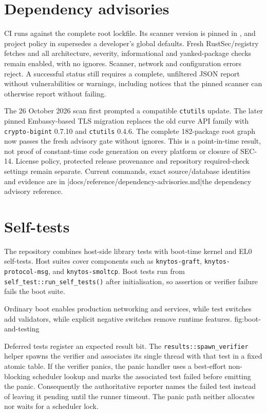 \section{Dependency advisories}

CI runs  against the complete root
lockfile. Its scanner version is pinned in , and project
policy in  supersedes a developer's global defaults.
Fresh RustSec/registry fetches and all architecture, severity, informational and
yanked-package checks remain enabled, with no ignores. Scanner, network and
configuration errors reject. A successful status still requires a complete,
unfiltered JSON report without vulnerabilities or warnings, including notices
that the pinned scanner can otherwise report without failing.

The 26 October 2026 scan first prompted a compatible \texttt{ctutils} update.
The later pinned Embassy-based TLS migration replaces the old curve API
family with \texttt{crypto-bigint} 0.7.10 and \texttt{ctutils} 0.4.6. The complete
182-package root graph now passes the fresh advisory gate without ignores.
This is a point-in-time result, not proof of constant-time code generation on
every platform or closure of SEC-14. License policy, protected release
provenance and repository required-check settings remain separate. Current
commands, exact source/database identities and evidence are in
\repofiletext|docs/reference/dependency-advisories.md|{the dependency advisory reference}.

\section{Self-tests}

The repository combines host-side library tests with boot-time kernel and EL0
self-tests. Host suites cover components such as \texttt{knytos-graft},
\texttt{knytos-protocol-msg}, and \texttt{knytos-smoltcp}. Boot tests run
from \texttt{self\_test::run\_self\_tests()} after initialisation, so assertion or
verifier failure fails the boot suite.

    {Ordinary boot enables production networking and services, while test switches
    add validators, while explicit negative switches remove runtime features.}
    {fig:boot-and-testing}

Deferred tests register an expected result bit. The
\texttt{results::spawn\_verifier} helper spawns the verifier and associates its
single thread with that test in a fixed atomic table. If the verifier
panics, the panic handler uses a best-effort non-blocking scheduler lookup and
marks the associated test failed before emitting the panic. Consequently the
authoritative reporter names the failed test instead of leaving it pending
until the runner timeout. The panic path neither allocates nor waits for a
scheduler lock.

